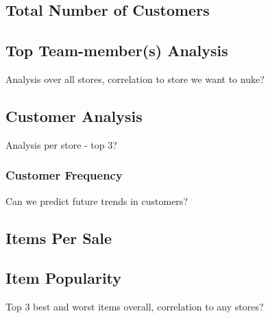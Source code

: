 \documentclass{article}
\begin{document}

            \subsection{Total Number of Customers}

            \subsection{Top Team-member(s) Analysis}
                Analysis over all stores, correlation to store we want to nuke?

            \subsection{Customer Analysis}
                Analysis per store - top 3?
                \subsubsection{Customer Frequency}
                    Can we predict future trends in customers? 

            \subsection{Items Per Sale}

            \subsection{Item Popularity}
                Top 3 best and worst items overall, correlation to any stores?
\end{document}
